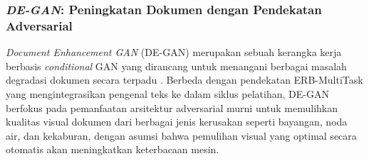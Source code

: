 \subsubsection{\textit{DE-GAN}: Peningkatan Dokumen dengan Pendekatan Adversarial}
\label{subsubsec:de-gan}

\textit{Document Enhancement GAN} (DE-GAN) merupakan sebuah kerangka kerja berbasis \textit{conditional} GAN yang dirancang untuk menangani berbagai masalah degradasi dokumen secara terpadu \parencite{souibgui2021degan}. Berbeda dengan pendekatan ERB-MultiTask yang mengintegrasikan pengenal teks ke dalam siklus pelatihan, DE-GAN berfokus pada pemanfaatan arsitektur adversarial murni untuk memulihkan kualitas visual dokumen dari berbagai jenis kerusakan seperti bayangan, noda air, dan kekaburan, dengan asumsi bahwa pemulihan visual yang optimal secara otomatis akan meningkatkan keterbacaan mesin.

